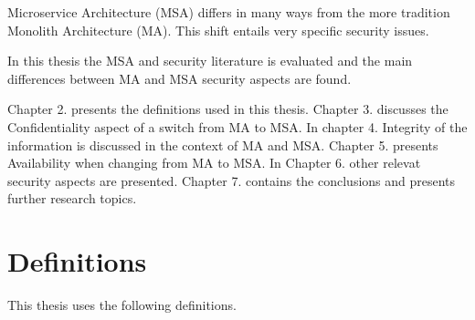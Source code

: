 \begin{sloppypar}
    Microservice Architecture (MSA) differs in many ways from 
    the more tradition Monolith Architecture (MA). This shift entails very specific security issues.

    In this thesis the MSA and security literature is evaluated and the main differences between
    MA and MSA security aspects are found.

    Chapter 2. presents the definitions used in this thesis. 
    Chapter 3. discusses the Confidentiality aspect of a switch from MA to MSA. 
    In chapter 4. Integrity of the information is discussed in the context of MA and MSA. 
    Chapter 5. presents Availability when changing from MA to MSA.
    In Chapter 6. other relevat security aspects are presented.
    Chapter 7. contains the conclusions and presents further research topics.
\end{sloppypar}


\section{Definitions}
\begin{sloppypar}
    This thesis uses the following definitions.
\end{sloppypar}



